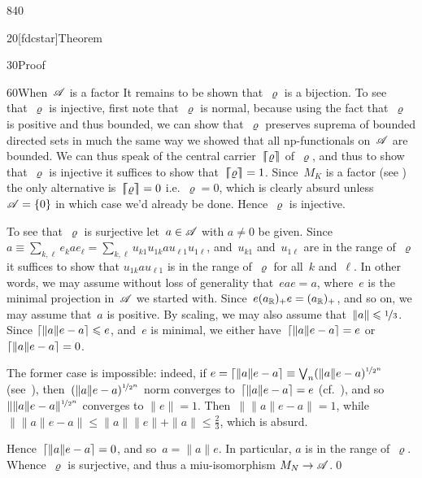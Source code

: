 \begin{parsec}{840}
\begin{point}{20}[fdcstar]{Theorem}
\begin{point}{30}{Proof}
\begin{point}{60}{When~$\scrA$ is a factor}
It remains to be shown that~$\varrho$ is a bijection.
To see that~$\varrho$ is injective,
first note that~$\varrho$
is normal,
because using the fact that~$\varrho$ is positive
and thus bounded,
we can show that~$\varrho$ preserves suprema of bounded directed
sets in much the same way we showed
that all np-functionals on~$\scrA$ are bounded.
We can thus speak of the central carrier~$\cceil{\varrho}$
of~$\varrho$,
and thus to show that~$\varrho$ is injective
it suffices to show that~$\cceil{\varrho}=1$.
Since~$M_K$ is a factor
(see )
the only alternative
is~$\cceil{\varrho}=0$
i.e.~$\varrho=0$,
which is clearly absurd
unless~$\scrA=\{0\}$
in which case
we'd already be done.
Hence~$\varrho$ is injective.

To see that~$\varrho$ is surjective
let~$a\in\scrA$ with $a\neq 0$ be given.
Since~$a\equiv \sum_{k,\ell} e_k a e_\ell
= \sum_{k,\ell}u_{k1} u_{1k}au_{\ell 1} u_{1\ell}$,
and~$u_{k1}$ and~$u_{1\ell}$ are in the range of~$\varrho$
it suffices
to show that $u_{1k}a u_{\ell 1}$
is in the range of~$\varrho$
for all~$k$ and~$\ell$.
In other words,
we may assume without loss of generality
that~$e a e = a$,
where~$e$ is the minimal projection in~$\scrA$ we started with.
Since~$e(\Real{a})_+e= (\Real{a})_+$, and so on,
we may assume that~$a$ is positive.
By scaling,
we may also assume that~$\|a\|\leq \nicefrac{1}{3}$.
Since $\ceil{\|a\|e -a}\leq e$,
and~$e$ is minimal,
we either have~$\ceil{\|a\|e-a}=e$
or~$\ceil{\|a\|e-a}=0$.

The former case is impossible:
indeed,
if $e=\ceil{\|a\|e-a}\equiv \bigvee_n (\|a\|e-a)^{\nicefrac{1}{2^n}}$
(see~),
then~$(\|a\|e-a)^{\nicefrac{1}{2^n}}$
norm converges to~$\ceil{\|a\|e-a}=e$
(cf.~),
and so $\|\|a\|e-a\|^{\nicefrac{1}{2^n}}$
converges to $\|e\|=1$.
Then~$\|\|a\|e-a\|=1$,
while~$\|\|a\|e-a\|\leq \|a\|\|e\|+\|a\|\leq  \frac{2}{3}$,
which is absurd.

Hence~$\ceil{\|a\|e-a}=0$,
and so~$a=\|a\|e$.
In particular, $a$ is in the range of~$\varrho$.
Whence~$\varrho$ is surjective,
and thus a miu-isomorphism $M_N\to\scrA$.\qed
\end{point}
\end{point}
\end{point}
\end{parsec}
